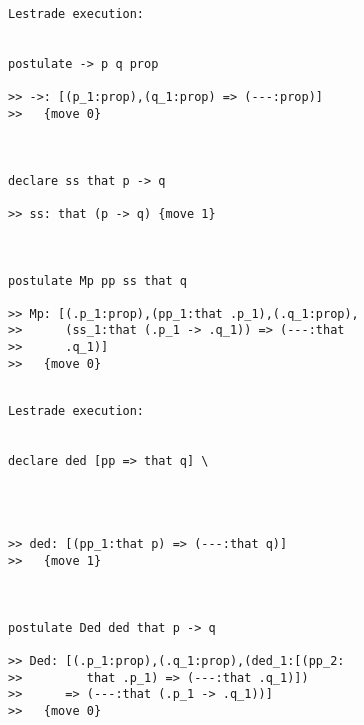 \documentclass{slides}
\begin{document}
\begin{slide}

\begin{verbatim}Lestrade execution:


postulate -> p q prop

>> ->: [(p_1:prop),(q_1:prop) => (---:prop)]
>>   {move 0}



declare ss that p -> q

>> ss: that (p -> q) {move 1}



postulate Mp pp ss that q

>> Mp: [(.p_1:prop),(pp_1:that .p_1),(.q_1:prop),
>>      (ss_1:that (.p_1 -> .q_1)) => (---:that
>>      .q_1)]
>>   {move 0}


\end{verbatim}

\end{slide}

\begin{slide}

\begin{verbatim}Lestrade execution:


declare ded [pp => that q] \
   



>> ded: [(pp_1:that p) => (---:that q)]
>>   {move 1}



postulate Ded ded that p -> q

>> Ded: [(.p_1:prop),(.q_1:prop),(ded_1:[(pp_2:
>>         that .p_1) => (---:that .q_1)])
>>      => (---:that (.p_1 -> .q_1))]
>>   {move 0}


\end{verbatim}
\end{slide}
\end{document}
